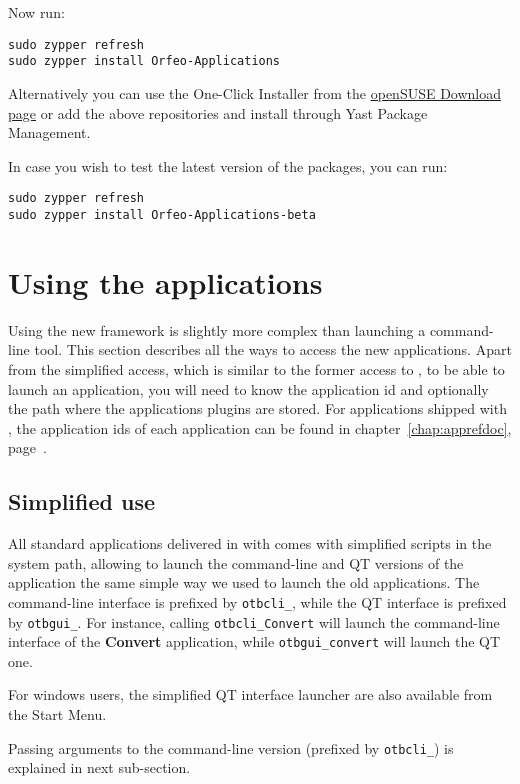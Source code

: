 Now run:
\begin{verbatim}
sudo zypper refresh
sudo zypper install Orfeo-Applications
\end{verbatim}

Alternatively you can use the One-Click Installer from the
\href{http://software.opensuse.org/search?q=Orfeo&baseproject=openSUSE\%3A11.4&lang=en&include_home=true&exclude_debug=true}{openSUSE
  Download page} or add the above repositories and install through
Yast Package Management.

In case you wish to test the latest version of the packages, you can run:
\begin{verbatim}
sudo zypper refresh
sudo zypper install Orfeo-Applications-beta
\end{verbatim}


\section{Using the applications}\label{sec:usingapps}

Using the new \app framework is slightly more complex than launching a
command-line tool. This section describes all the ways to access the
new applications. Apart from the simplified access, which is similar
to the former access to \app, to be able to launch an application, you
will need to know the application id and optionally the path where the
applications plugins are stored. For applications shipped with \otb,
the application ids of each application can be found in
chapter~\ref{chap:apprefdoc}, page~\pageref{chap:apprefdoc}.

\subsection{Simplified use}

All standard applications delivered in with \otb comes with simplified
scripts in the system path, allowing to launch the command-line and QT
versions of the application the same simple way we used to launch the
old applications. The command-line interface is prefixed by
\verb?otbcli_?, while the QT interface is prefixed by
\verb?otbgui_?. For instance, calling \verb?otbcli_Convert? will
launch the command-line interface of the \textbf{Convert} application,
while \verb?otbgui_convert? will launch the QT one.

For windows users, the simplified QT interface launcher are also
available from the Start Menu.

Passing arguments to the command-line version (prefixed by
\verb?otbcli_?) is explained in next sub-section.

